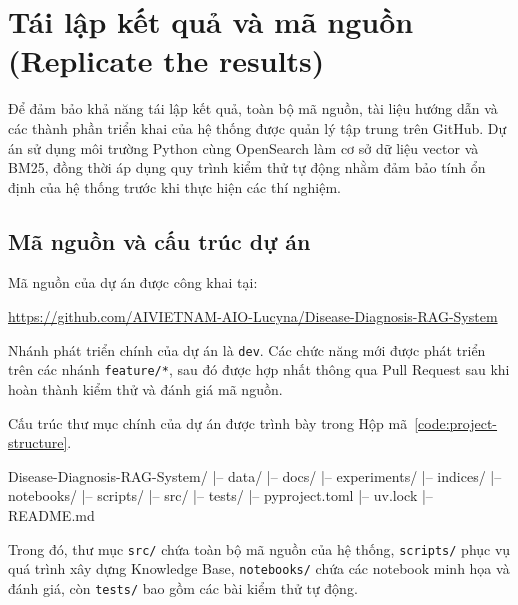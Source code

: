 \section{Tái lập kết quả và mã nguồn (Replicate the results)}

Để đảm bảo khả năng tái lập kết quả, toàn bộ mã nguồn, tài liệu hướng dẫn và các thành phần triển khai của hệ thống được quản lý tập trung trên GitHub. Dự án sử dụng môi trường Python cùng OpenSearch làm cơ sở dữ liệu vector và BM25, đồng thời áp dụng quy trình kiểm thử tự động nhằm đảm bảo tính ổn định của hệ thống trước khi thực hiện các thí nghiệm.

\subsection{Mã nguồn và cấu trúc dự án}

Mã nguồn của dự án được công khai tại:

\begin{center}
    \url{https://github.com/AIVIETNAM-AIO-Lucyna/Disease-Diagnosis-RAG-System}
\end{center}

Nhánh phát triển chính của dự án là \texttt{dev}. Các chức năng mới được phát triển trên các nhánh \texttt{feature/*}, sau đó được hợp nhất thông qua Pull Request sau khi hoàn thành kiểm thử và đánh giá mã nguồn.

Cấu trúc thư mục chính của dự án được trình bày trong Hộp mã~\ref{code:project-structure}.

\begin{aivncodebox}
    \label{code:project-structure}
    Disease-Diagnosis-RAG-System/
    |-- data/                %
    |-- docs/                %
    |-- experiments/         %
    |-- indices/             %
    |-- notebooks/           %
    |-- scripts/             %
    |-- src/                 %
    |-- tests/               %
    |-- pyproject.toml
    |-- uv.lock
    |-- README.md
\end{aivncodebox}

Trong đó, thư mục \texttt{src/} chứa toàn bộ mã nguồn của hệ thống, \texttt{scripts/} phục vụ quá trình xây dựng Knowledge Base, \texttt{notebooks/} chứa các notebook minh họa và đánh giá, còn \texttt{tests/} bao gồm các bài kiểm thử tự động.


